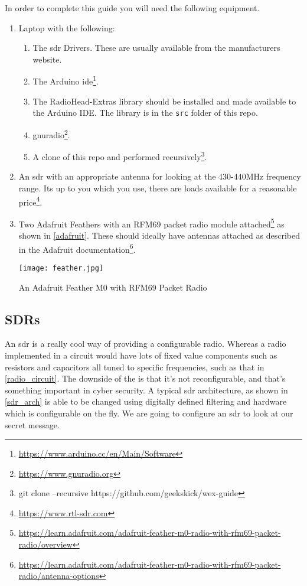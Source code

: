 In order to complete this guide you will need the following equipment.

\begin{enumerate}
\item Laptop with the following: 
\begin{enumerate}
\item The \gls{sdr} Drivers. These are usually available from the manufacturers website.
\item The Arduino \gls{ide}\footnote{\url{https://www.arduino.cc/en/Main/Software}}.
\item The RadioHead-Extras library should be installed and made available to the Arduino IDE. The library is in the \verb|src| folder of this \gls{repo}.
\item gnuradio\footnote{\url{https://www.gnuradio.org}}.
\item A clone of this \gls{repo} and performed recursively\footnote{git clone --recursive https://github.com/geekskick/wex-guide}.
\end{enumerate}
\item An \gls{sdr} with an appropriate antenna for looking at the 430-440MHz frequency range. Its up to you which you use, there are loads available for a reasonable price\footnote{\url{https://www.rtl-sdr.com}}.
\item Two Adafruit Feathers with an RFM69 packet radio module attached\footnote{\url{https://learn.adafruit.com/adafruit-feather-m0-radio-with-rfm69-packet-radio/overview}} as shown in \cref{adafruit}. These should ideally have antennas attached as described in the Adafruit documentation\footnote{\url{https://learn.adafruit.com/adafruit-feather-m0-radio-with-rfm69-packet-radio/antenna-options}}. 

\centrefigurestart
\texttt{[image: feather.jpg]}
\caption{An Adafruit Feather M0 with RFM69 Packet Radio}
\label{adafruit}
\centrefigureend

\end{enumerate}

\subsection{SDRs}
An \gls{sdr} is a really cool way of providing a configurable radio. Whereas a radio implemented in a circuit would have lots of fixed value components such as resistors and capacitors all tuned to specific frequencies, such as that in \cref{radio_circuit}. The downside of the is that it's not reconfigurable, and that's something important in cyber security. A typical \gls{sdr} architecture, as shown in \cref{sdr_arch} is able to be changed using digitally defined filtering and hardware which is configurable on the fly. We are going to configure an \gls{sdr} to look at our secret message.

